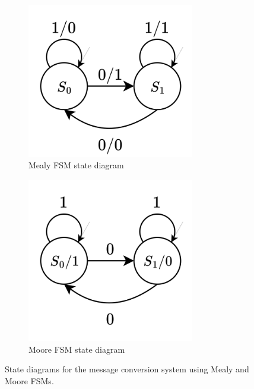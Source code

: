 \documentclass[../main.tex]{subfiles}
\begin{document}
\vspace{-10pt}
\begin{figure}[h]
    \centering
    \begin{subfigure}{0.48\textwidth}
        \centering
        \includegraphics[width=0.8\textwidth]{assets/q2_mealy.png}
        \caption{Mealy FSM state diagram}
        \label{fig:q2_mealy}
    \end{subfigure}
    \hfill
    \begin{subfigure}{0.48\textwidth}
        \centering
        \includegraphics[width=0.8\textwidth]{assets/q2_moore.png}
        \caption{Moore FSM state diagram}
        \label{fig:q2_moore}
    \end{subfigure}
    \caption{State diagrams for the message conversion system using Mealy and Moore FSMs.}
    \label{fig:q2_fsm}
\end{figure}
\end{document}
